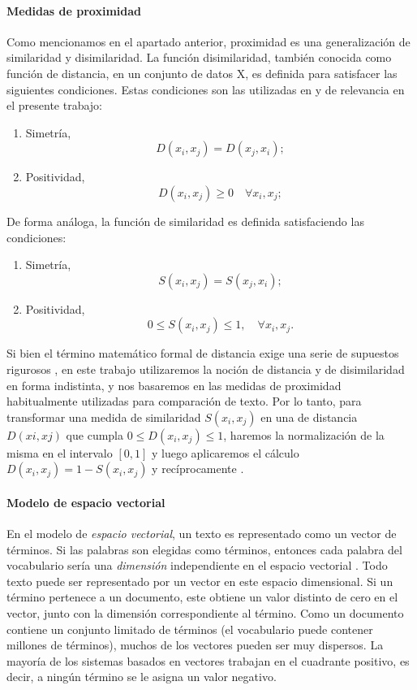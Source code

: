\paragraph{Medidas de proximidad}
Como mencionamos en el apartado anterior, proximidad es una generalización de similaridad y disimilaridad. La función disimilaridad, también conocida como función de distancia, en un conjunto de datos X, es definida para satisfacer las siguientes condiciones. Estas condiciones son las utilizadas en \citep{xu2008clustering} y de relevancia en el presente trabajo:

\begin{enumerate}
	\item Simetría,
	\[D(x_i,x_j)=D(x_j,x_i);\]

	\item Positividad,
	\[D(x_i,x_j) \geq 0 \quad \forall x_i,x_j;\]
\end{enumerate}

De forma análoga, la función de similaridad es definida satisfaciendo las condiciones:
\begin{enumerate}
	\item Simetría,
	\[S(x_i,x_j)=S(x_j,x_i);\]

	\item Positividad,
	\[0 \leq S(x_i,x_j) \leq 1, \quad \forall x_i,x_j.\]
\end{enumerate}

Si bien el término matemático formal de distancia exige una serie de supuestos rigurosos \citep{xu2008clustering}, en este trabajo utilizaremos la noción de distancia y de disimilaridad en forma indistinta, y nos basaremos en las medidas de proximidad habitualmente utilizadas para comparación de texto. Por lo tanto, para transformar una medida de similaridad \(S(x_i,x_j)\) en una de distancia \(D(xi,xj)\) que cumpla \(0 \leq D(x_i,x_j) \leq 1\), haremos la normalización de la misma en el intervalo \([0,1]\) y luego aplicaremos el cálculo \(D(x_i,x_j) = 1 - S(x_i,x_j)\) y recíprocamente \citep{leale2013novel}.

\paragraph{Modelo de espacio vectorial}
En el modelo de \textit{espacio vectorial}, un texto es representado como un vector de términos. Si las palabras son elegidas como términos, entonces cada palabra del vocabulario sería una \textit{dimensión} independiente en el espacio vectorial \citep{singhal2001modern}. Todo texto puede ser representado por un vector en este espacio dimensional. Si un término pertenece a un documento, este obtiene un valor distinto de cero en el vector, junto con la dimensión correspondiente al término. Como un documento contiene un conjunto limitado de términos (el vocabulario puede contener millones de términos), muchos de los vectores pueden ser muy dispersos. La mayoría de los sistemas basados en vectores trabajan en el cuadrante positivo, es decir, a ningún término se le asigna un valor negativo.

